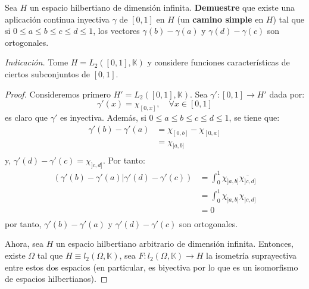\documentclass[12pt]{report}
\newcounter{it}
\theoremstyle{largebreak}
\newcommand\cf[3]{\ensuremath{#1:#2\rightarrow#3}}
\newcommand\pint[2]{\ensuremath{\left(#1\big|#2\right)}}
\newcommand\conj[1]{\ensuremath{\overline{#1}}}
\begin{document}
    \begin{excer}
        Sea $H$ un espacio hilbertiano de dimensión infinita. \textbf{Demuestre} que existe una aplicación continua inyectiva $\gamma$ de $[0,1]$ en $H$ (un \textbf{camino simple} en $H$) tal que si $0\leq a\leq b\leq c\leq d\leq 1$, los vectores $\gamma(b)-\gamma(a)$ y $\gamma(d)-\gamma(c)$ son ortogonales.

        \textit{Indicación.} Tome $H=L_2([0,1],\mathbb{K})$ y considere funciones características de ciertos subconjuntos de $[0,1]$.
    \end{excer}

    \begin{proof}
        Consideremos primero $H'=L_2([0,1],\mathbb{K})$. Sea $\cf{\gamma'}{[0,1]}{H'}$ dada por:
        \begin{equation*}
            \gamma'(x)=\chi_{[0,x]},\quad\forall x\in[0,1]
        \end{equation*}
        es claro que $\gamma'$ es inyectiva. Además, si $0\leq a\leq b\leq c\leq d\leq 1$, se tiene que:
        \begin{equation*}
            \begin{split}
                \gamma'(b)-\gamma'(a)&=\chi_{[0,b]}-\chi_{[0,a]}\\
                &=\chi_{]a,b]}\\
            \end{split}
        \end{equation*}
        y, $\gamma'(d)-\gamma'(c)=\chi_{]c,d]}$. Por tanto:
        \begin{equation*}
            \begin{split}
                \pint{\gamma'(b)-\gamma'(a)}{\gamma'(d)-\gamma'(c)}&=\int_{0}^{1}\chi_{]a,b]}\conj{\chi_{]c,d]}}\\
                &=\int_{0}^{1}\chi_{]a,b]}\chi_{]c,d]}\\
                &=0\\
            \end{split}
        \end{equation*}
        por tanto, $\gamma'(b)-\gamma'(a)$ y $\gamma'(d)-\gamma'(c)$ son ortogonales.

        Ahora, sea $H$ un espacio hilbertiano arbitrario de dimensión infinita. Entonces, existe $\Omega$ tal que $H\equiv l_2(\Omega,\mathbb{K})$, sea $\cf{F}{l_2(\Omega,\mathbb{K})}{H}$ la isometría suprayectiva entre estos dos espacios (en particular, es biyectiva por lo que es un isomorfismo de espacios hilbertianos).
        

\end{proof}
\end{document}
